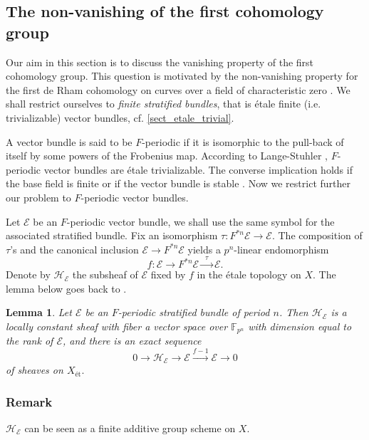 \documentclass[12pt,a4]{amsart}
\newtheorem{lem}[claim]{Lemma}
\theoremstyle{definition}
\begin{document}
\subsection{The non-vanishing of the first cohomology group}
\label{sect_comparison_torsion}

Our aim in this section is to discuss the vanishing property of the first cohomology group.  
This question is motivated by the non-vanishing property for the first de Rham
cohomology on curves over a field of characteristic zero \cite{BHT25}.
We shall restrict ourselves to \textit{finite stratified bundles}, that is
\'etale finite (i.e. trivializable) vector bundles, cf. \ref{sect_etale_trivial}. 



A vector bundle is said to be $F$-periodic if it is isomorphic to the pull-back of itself by
some powers of the Frobenius map. 
According to Lange-Stuhler \cite{LS77}, $F$-periodic vector bundles are \'etale trivializable.
The converse implication holds if the base field is finite or if the
vector bundle is stable \cite{BD07}. Now we restrict further our problem to $F$-periodic vector bundles.  

Let $\mathcal E$ be an $F$-periodic vector bundle, we shall use the same symbol for
the associated stratified bundle. Fix an isomorphism 
$\tau: F^{*n}\mathcal E\longrightarrow
\mathcal E$.  
The composition of $\tau$'s and the canonical inclusion
$\mathcal E\longrightarrow F^{*n}  \mathcal E $ yields a $p^n$-linear endomorphism
$$f:\mathcal E \longrightarrow  F^{*n}  \mathcal E\xrightarrow{\,\,\,\tau\,\,\,} \mathcal E.$$ 
Denote by $\mathcal H_{\mathcal E}$ the subsheaf of $\mathcal E$ 
fixed by $f$ in the \'etale topology on $X$. The lemma below goes back to
 \cite[Propositions 1.1 and 1.2]{Kat69}.
 
\begin{lem}\label{lem_etale_sheaf}
Let \(\mathcal E\) be an \(F\)-periodic stratified bundle of period \(n\).
Then $\mathcal H_{\mathcal E}$ is a locally constant sheaf with fiber a vector space over $\mathbb F_{p^n}$ with dimension equal to the rank of $\mathcal E$, 
and there is an exact sequence 
$$0 \rightarrow \mathcal H_{\mathcal E} \longrightarrow 
\mathcal E  \xrightarrow{f-1} \mathcal E  \longrightarrow 0$$ 
of sheaves on $X_\text{\'et}.$
\end{lem}

\subsubsection*{Remark} $\mathcal H_{\mathcal E}$ can be seen as a finite additive group scheme on $X$.
\end{document}

